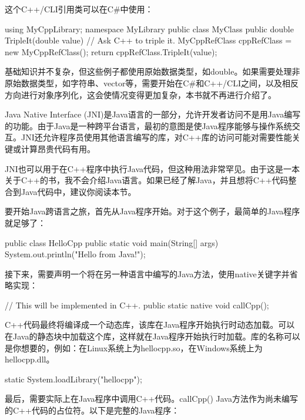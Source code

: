 这个C++/CLI引用类可以在C\#中使用：

\begin{cpp}
using MyCppLibrary;
namespace MyLibrary
{
    public class MyClass
    {
        public double TripleIt(double value)
        {
            // Ask C++ to triple it.
            MyCppRefClass cppRefClass = new MyCppRefClass();
            return cppRefClass.TripleIt(value);
        }
    }
}
\end{cpp}

基础知识并不复杂，但这些例子都使用原始数据类型，如double。如果需要处理非原始数据类型，如字符串、vector等，需要开始在C\#和C++/CLI之间，以及相反方向进行对象序列化，这会使情况变得更加复杂，本书就不再进行介绍了。


Java Native Interface (JNI)是Java语言的一部分，允许开发者访问不是用Java编写的功能。由于Java是一种跨平台语言，最初的意图是使Java程序能够与操作系统交互。JNI还允许程序员使用其他语言编写的库，对C++库的访问可能对需要性能关键或计算昂贵代码有用。

JNI也可以用于在C++程序中执行Java代码，但这种用法非常罕见。由于这是一本关于C++的书，我不会介绍Java语言。如果已经了解Java，并且想将C++代码整合到Java代码中，建议你阅读本节。

要开始Java跨语言之旅，首先从Java程序开始。对于这个例子，最简单的Java程序就足够了：

\begin{cpp}
public class HelloCpp
{
    public static void main(String[] args)
    {
        System.out.println("Hello from Java!");
    }
}
\end{cpp}

接下来，需要声明一个将在另一种语言中编写的Java方法，使用native关键字并省略实现：

\begin{cpp}
// This will be implemented in C++.
public static native void callCpp();
\end{cpp}

C++代码最终将编译成一个动态库，该库在Java程序开始执行时动态加载。可以在Java的静态块中加载这个库，这样就在Java程序开始执行时加载。库的名称可以是你想要的，例如：在Linux系统上为hellocpp.so，在Windows系统上为hellocpp.dll。

\begin{cpp}
static { System.loadLibrary("hellocpp"); }
\end{cpp}

最后，需要实际上在Java程序中调用C++代码。callCpp() Java方法作为尚未编写的C++代码的占位符。以下是完整的Java程序：

